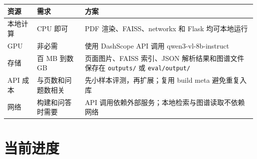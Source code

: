 \begin{longtable}[]{@{}
  >{\raggedright\arraybackslash}p{}
  >{\raggedright\arraybackslash}p{}
  >{\raggedright\arraybackslash}p{}@{}}
\toprule\noalign{}
\begin{minipage}[b]{\linewidth}\raggedright
资源
\end{minipage} & \begin{minipage}[b]{\linewidth}\raggedright
需求
\end{minipage} & \begin{minipage}[b]{\linewidth}\raggedright
方案
\end{minipage} \\
\midrule\noalign{}
\endhead
\bottomrule\noalign{}
\endlastfoot
本地计算 & CPU 即可 & PDF 渲染、FAISS、networkx 和 Flask 均可本地运行 \\
GPU & 非必需 & 使用 DashScope API 调用 qwen3-vl-8b-instruct \\
存储 & 百 MB 到数 GB & 页面图片、FAISS 索引、JSON
解析结果和图谱文件保存在 \texttt{outputs/} 或 \texttt{eval/output/} \\
API 成本 & 与页数和问题数相关 & 先小样本评测，再扩展；复用 build meta
避免重复入库 \\
网络 & 构建和问答时需要 & API
调用依赖外部服务；本地检索与图谱读取不依赖网络 \\
\end{longtable}

\section{当前进度}\label{ux5f53ux524dux8fdbux5ea6}

